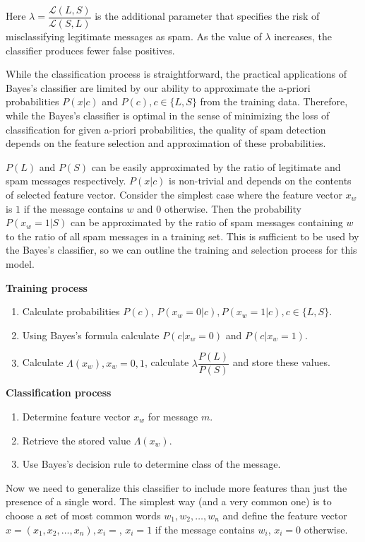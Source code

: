 \documentclass[12pt]{report}
\newcommand{\Loss}{\mathcal{L}}
\begin{document}
Here $\lambda = \dfrac{\Loss(L, S)}{\Loss(S, L)}$ is the additional parameter that specifies the risk of misclassifying legitimate messages as spam. As the value of $\lambda$ increases, the classifier produces fewer false positives.

While the classification process is straightforward, the practical applications of Bayes's classifier are limited by our ability to approximate the a-priori probabilities $P(x | c)$ and $P(c), c \in \{L, S\}$ from the training data. Therefore, while the Bayes's classifier is optimal in the sense of minimizing the loss of classification for given a-priori probabilities, the quality of spam detection depends on the feature selection and approximation of these probabilities.

$P(L)$ and $P(S)$ can be easily approximated by the ratio of legitimate and spam messages respectively. $P(x | c)$ is non-trivial and depends on the contents of selected feature vector. Consider the simplest case where the feature vector $x_w$ is $1$ if the message contains $w$ and $0$ otherwise. Then the probability $P(x_w = 1 | S)$ can be approximated by the ratio of spam messages containing $w$ to the ratio of all spam messages in a training set. This is sufficient to be used by the Bayes's classifier, so we can outline the training and selection process for this model.

\textbf{Training process}

\begin{enumerate}
	\item Calculate probabilities $P(c)$, $P(x_w = 0 | c), P(x_w = 1 | c), c \in \{L, S\}$.
	\item Using Bayes's formula calculate $P(c | x_w = 0)$ and $P(c | x_w = 1)$.
	\item Calculate $\Lambda(x_w), x_w = 0, 1$, calculate $\lambda \dfrac{P(L)}{P(S)}$ and store these values.
\end{enumerate}

\textbf{Classification process}

\begin{enumerate}
	\item Determine feature vector $x_w$ for message $m$.
	\item Retrieve the stored value $\Lambda(x_w)$.
	\item Use Bayes's decision rule to determine class of the message.
\end{enumerate}

Now we need to generalize this classifier to include more features than just the presence of a single word. The simplest way (and a very common one) is to choose a set of most common words $w_1, w_2, \dots, w_n$ and define the feature vector $x = (x_1, x_2, \dots, x_n), x_i = $, $x_i = 1$ if the message contains $w_i$, $x_i = 0$ otherwise.
\end{document}
